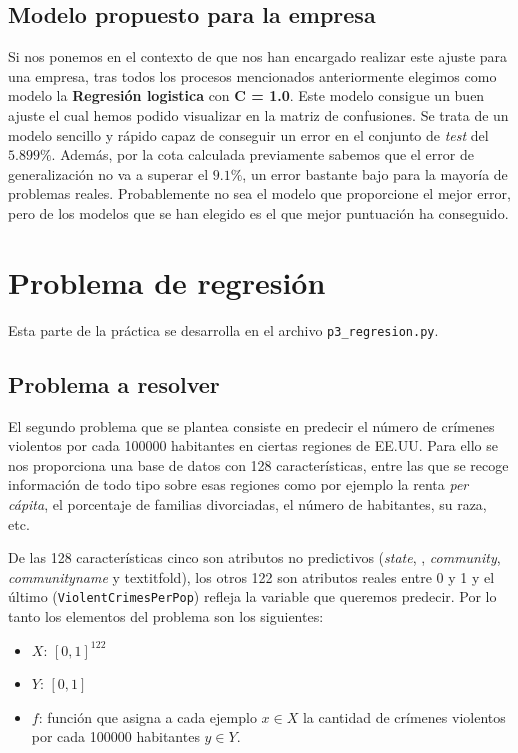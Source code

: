 \documentclass[size=a4, parskip=half, titlepage=false, toc=flat, toc=bib, 12pt]{scrartcl}
\begin{document}
\subsection{Modelo propuesto para la empresa}
Si nos ponemos en el contexto de que nos han encargado realizar este ajuste para una empresa, tras todos los procesos mencionados anteriormente elegimos como modelo la \textbf{Regresión logistica} con \textbf{C = 1.0}. Este modelo consigue un buen ajuste el cual hemos podido visualizar en la matriz de confusiones. Se trata de un modelo sencillo y rápido capaz de conseguir un error en el conjunto de \textit{test} del $5.899\%$. Además, por la cota calculada previamente sabemos que el error de generalización no va a superar el $9.1\%$, un error bastante bajo para la mayoría de problemas reales. Probablemente no sea el modelo que proporcione el mejor error, pero de los modelos que se han elegido es el que mejor puntuación ha conseguido.

\newpage
\section{Problema de regresión}

Esta parte de la práctica se desarrolla en el archivo \verb|p3_regresion.py|.

\subsection{Problema a resolver}

El segundo problema que se plantea consiste en predecir el número de crímenes violentos por cada 100000 habitantes en ciertas regiones de EE.UU. Para ello se nos proporciona una base de datos con 128 características, entre las que se recoge información de todo tipo sobre esas regiones como por ejemplo la renta \textit{per cápita}, el porcentaje de familias divorciadas, el número de habitantes, su raza, etc.

De las 128 características cinco son atributos no predictivos (\textit{state}, , \textit{community}, \textit{communityname} y  textit{fold}), los otros 122 son atributos reales entre 0 y 1 y el último (\verb|ViolentCrimesPerPop|) refleja la variable que queremos predecir. Por lo tanto los elementos del problema son los siguientes:
\begin{itemize}
\item $X$: $[0,1]^{122}$
\item $Y$: $[0,1]$
\item $f$: función que asigna a cada ejemplo $x \in X$ la cantidad de crímenes violentos por cada 100000 habitantes $y \in Y$.
\end{itemize}
\end{document}
